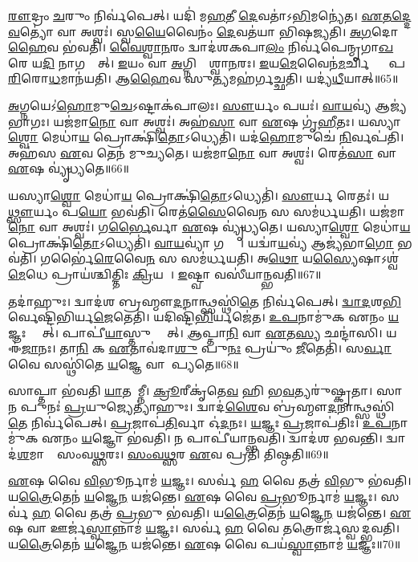 \ul{𑌰𑍗}𑌦𑍍𑌰𑌂 \ul{𑌚}𑌰𑍁𑌂 𑌨𑌿𑌰𑍍𑌵॑𑌪𑍇𑌤𑍍।
𑌯𑌦𑌿॑ 𑌮\ul{𑌹}𑌤𑍀 \ul{𑌦𑍇}𑌵𑌤𑌾॑\-𑌽\ul{𑌭𑌿}𑌮𑌨𑍍𑌯𑍇॑𑌤।
\ul{𑌏}\ul{𑌤}\ul{𑌦𑍍𑌦𑍇}\ul{𑌵}𑌤𑍍𑌯𑍋॑ 𑌵𑌾 𑌅𑌶𑍍𑌵𑌃॑।
𑌸𑍍𑌵\ul{𑌯𑍈}𑌵𑍈𑌨𑌂॑ \ul{𑌦𑍇}𑌵𑌤॑𑌯𑌾 𑌭𑌿𑌷𑌜𑍍𑌯𑌤𑌿।
\ul{𑌅}\ul{𑌗}𑌦𑍋 \ul{𑌹𑍈}𑌵 𑌭॑𑌵𑌤𑌿।
\ul{𑌵𑍈}\ul{𑌶𑍍𑌵𑌾}\ul{𑌨}𑌰𑌂 𑌦𑍍𑌵𑌾𑌦॑𑌶𑌕𑌪𑌾\ul{𑌲𑌂} 𑌨𑌿𑌰𑍍𑌵॑𑌪𑍇𑌨𑍍𑌮𑍃𑌗𑌾\ul{𑌖}𑌰𑍇 𑌯\ul{𑌦𑌿} 𑌨𑌾𑌗𑌚𑍍𑌛𑍇᳚𑌤𑍍।
\ul{𑌇}𑌯𑌂 𑌵𑌾 \ul{𑌅}𑌗𑍍𑌨𑌿𑌰𑍍𑌵𑍈᳚𑌶𑍍𑌵𑌾\ul{𑌨}𑌰𑌃।
\ul{𑌇}𑌯\ul{𑌮𑍇}𑌵𑍈𑌨॑\ul{𑌮}𑌰𑍍𑌚𑌿𑌭𑍍𑌯𑌾𑌂᳚ 𑌪\ul{𑌰𑌿}𑌰𑍋\ul{𑌧}𑌮𑌾𑌨॑𑌯𑌤𑌿।
𑌆\ul{𑌹𑍈}𑌵 𑌸𑍁\ul{𑌤𑍍𑌯}𑌮𑌹॑𑌰𑍍𑌗𑌚𑍍𑌛𑌤𑌿।
𑌯𑌦𑍍𑌯॑\ul{𑌧𑍀}𑌯𑌾𑌤𑍍॥65॥

\ul{𑌅}𑌗𑍍𑌨𑌯𑍇\-𑌽॑\ul{𑌹𑍋}𑌮𑍁\ul{𑌚𑍇}\-𑌽𑌷𑍍𑌟𑌾𑌕॑𑌪𑌾𑌲𑌃।
\ul{𑌸𑍗}𑌰𑍍𑌯𑌂 𑌪𑌯𑌃॑।
\ul{𑌵𑌾}\ul{𑌯}𑌵𑍍𑌯॑ 𑌆𑌜𑍍𑌯॑𑌭𑌾𑌗𑌃।
𑌯𑌜॑𑌮𑌾\ul{𑌨𑍋} 𑌵𑌾 𑌅𑌶𑍍𑌵𑌃॑।
𑌅𑌹॑\ul{𑌸𑌾} 𑌵𑌾 \ul{𑌏}𑌷 𑌗𑍃॑\ul{𑌹𑍀}𑌤𑌃।
𑌯𑌸𑍍𑌯𑌾\ul{𑌶𑍍𑌵𑍋} 𑌮𑍇𑌧𑌾॑\ul{𑌯} 𑌪𑍍𑌰𑍋𑌕𑍍𑌷𑌿॑\ul{𑌤𑍋}\-𑌽𑌧𑍍𑌯𑍇𑌤𑌿॑।
𑌯𑌦॑\ul{𑌹𑍋}𑌮𑍁𑌚𑍇॑ \ul{𑌨𑌿}𑌰𑍍𑌵𑌪॑𑌤𑌿।
𑌅𑌹॑𑌸 \ul{𑌏}𑌵 𑌤𑍇𑌨॑ 𑌮𑍁𑌚𑍍𑌯𑌤𑍇।
𑌯𑌜॑𑌮𑌾\ul{𑌨𑍋} 𑌵𑌾 𑌅𑌶𑍍𑌵𑌃॑।
𑌰𑍇𑌤॑\ul{𑌸𑌾} 𑌵𑌾 \ul{𑌏}𑌷 𑌵𑍍𑌯𑍃॑𑌧𑍍𑌯𑌤𑍇॥66॥

𑌯𑌸𑍍𑌯𑌾\ul{𑌶𑍍𑌵𑍋} 𑌮𑍇𑌧𑌾॑\ul{𑌯} 𑌪𑍍𑌰𑍋𑌕𑍍𑌷𑌿॑\ul{𑌤𑍋}\-𑌽𑌧𑍍𑌯𑍇𑌤𑌿॑।
\ul{𑌸𑍗}𑌰𑍍𑌯 𑌰𑍇𑌤𑌃॑।
𑌯\ul{𑌥𑍍𑌸𑍗}𑌰𑍍𑌯𑌂 𑌪\ul{𑌯𑍋} 𑌭𑌵॑𑌤𑌿।
𑌰𑍇𑌤॑\ul{𑌸𑍈}𑌵𑍈\ul{𑌨}\ul{} 𑌸 𑌸𑌮॑𑌰𑍍𑌧𑌯𑌤𑌿।
𑌯𑌜॑𑌮𑌾\ul{𑌨𑍋} 𑌵𑌾 𑌅𑌶𑍍𑌵𑌃॑।
𑌗\ul{𑌰𑍍𑌭𑍈}𑌰𑍍𑌵𑌾 \ul{𑌏}𑌷 𑌵𑍍𑌯𑍃॑𑌧𑍍𑌯𑌤𑍇।
𑌯𑌸𑍍𑌯𑌾\ul{𑌶𑍍𑌵𑍋} 𑌮𑍇𑌧𑌾॑\ul{𑌯} 𑌪𑍍𑌰𑍋𑌕𑍍𑌷𑌿॑\ul{𑌤𑍋}\-𑌽𑌧𑍍𑌯𑍇𑌤𑌿॑।
\ul{𑌵𑌾}\ul{𑌯}𑌵𑍍𑌯𑌾॑ 𑌗𑌰𑍍𑌭𑌾𑌃᳚।
𑌯𑌦𑍍𑌵𑌾॑\ul{𑌯}𑌵𑍍𑌯॑ 𑌆𑌜𑍍𑌯॑𑌭𑌾\ul{𑌗𑍋} 𑌭𑌵॑𑌤𑌿।
𑌗𑌰𑍍𑌭𑍈॑\ul{𑌰𑍇}𑌵𑍈\ul{𑌨}\ul{} 𑌸 𑌸𑌮॑𑌰𑍍𑌧𑌯𑌤𑌿।
𑌅\ul{𑌥𑍋} 𑌯\ul{𑌸𑍍𑌯𑍈}𑌷𑌾\-𑌽𑌶𑍍𑌵॑\ul{𑌮𑍇}𑌧𑍇 𑌪𑍍𑌰𑌾𑌯॑𑌶𑍍𑌚𑌿𑌤𑍍𑌤𑌿𑌃 \ul{𑌕𑍍𑌰𑌿}𑌯𑌤𑍇᳚।
\ul{𑌇}𑌷𑍍𑌟𑍍𑌵𑌾 𑌵𑌸𑍀॑𑌯𑌾𑌨𑍍𑌭𑌵𑌤𑌿॥67॥\anuvakamend[\ul{𑌵𑌿}𑌨𑍍𑌦𑌤𑍍𑌯𑌶𑍍𑌲𑍋॑𑌣𑍋 \ul{𑌹𑍈}𑌵 𑌭॑𑌵𑌤𑍍𑌯\ul{𑌧𑍀}𑌯𑌾𑌦𑍃॑𑌧𑍍𑌯\ul{𑌤𑍇} 𑌗𑌰𑍍𑌭𑍈॑\ul{𑌰𑍇}𑌵𑍈\ul{𑌨}\ul{\dng{ꣳ}} 𑌸 𑌸𑌮॑𑌰𑍍𑌧𑌯\ul{𑌤𑌿} 𑌦𑍍𑌵𑍇 𑌚॑]

𑌤𑌦𑌾॑𑌹𑍁𑌃।
𑌦𑍍𑌵𑌾𑌦॑𑌶 𑌬𑍍𑌰𑌹𑍍𑌮𑍗\ul{𑌦}𑌨𑌾𑌨𑍍𑌥𑍍𑌸𑌸𑍍𑌥𑌿॑\ul{𑌤𑍇} 𑌨𑌿𑌰𑍍𑌵॑𑌪𑍇𑌤𑍍।
\ul{𑌦𑍍𑌵𑌾}\ul{𑌦}𑌶\ul{𑌭𑌿}𑌰𑍍𑌵𑍇𑌷𑍍𑌟𑌿॑𑌭𑌿𑌰𑍍𑌯\ul{𑌜𑍇}𑌤𑍇𑌤𑌿॑।
𑌯𑌦𑌿𑌷𑍍𑌟𑌿॑\ul{𑌭𑌿}𑌰𑍍𑌯𑌜𑍇॑𑌤।
\ul{𑌉}\ul{𑌪}𑌨𑌾𑌮𑍁॑𑌕 𑌏𑌨𑌂 \ul{𑌯}𑌜𑍍𑌞𑌃 𑌸𑍍𑌯𑌾᳚𑌤𑍍।
𑌪𑌾𑌪𑍀॑\ul{𑌯𑌾}\ul{}𑌸𑍍𑌤𑍁 𑌸𑍍𑌯𑌾᳚𑌤𑍍।
\ul{𑌆}𑌪𑍍𑌤𑌾\ul{𑌨𑌿} 𑌵𑌾 \ul{𑌏}𑌤\ul{𑌸𑍍𑌯} 𑌛𑌨𑍍𑌦𑌾॑𑌸𑌿।
𑌯 𑌈॑\ul{𑌜𑌾}𑌨𑌃।
𑌤𑌾\ul{𑌨𑌿} 𑌕 \ul{𑌏}𑌤𑌾𑌵॑𑌦𑌾\ul{𑌶𑍁} 𑌪𑍁\ul{𑌨𑌃} 𑌪𑍍𑌰𑌯𑍁𑌂॑ \ul{𑌜𑍀}𑌤𑍇𑌤𑌿॑।
𑌸\ul{𑌰𑍍𑌵𑌾} 𑌵𑍈 𑌸𑌸𑍍𑌥𑌿॑𑌤𑍇 \ul{𑌯}𑌜𑍍𑌞𑍇 𑌵𑌾𑌗𑌾᳚𑌪𑍍𑌯𑌤𑍇॥68॥

𑌸𑌾𑌪𑍍𑌤𑌾 𑌭॑𑌵𑌤𑌿 \ul{𑌯𑌾}𑌤𑌯𑌾᳚𑌮𑍍𑌨𑍀।
\ul{𑌕𑍍𑌰𑍂}𑌰𑍀𑌕𑍃॑𑌤𑍇\ul{𑌵} 𑌹𑌿 𑌭\ul{𑌵}𑌤𑍍𑌯𑌰𑍁॑𑌷𑍍𑌕𑍃𑌤𑌾।
𑌸𑌾 𑌨 𑌪𑍁𑌨𑌃॑ \ul{𑌪𑍍𑌰}𑌯𑍁𑌜𑍍𑌯𑍇𑌤𑍍𑌯𑌾॑𑌹𑍁𑌃।
𑌦𑍍𑌵𑌾𑌦॑\ul{𑌶𑍈}𑌵 𑌬𑍍𑌰॑𑌹𑍍𑌮𑍗\ul{𑌦}𑌨𑌾𑌨𑍍𑌥𑍍𑌸𑌸𑍍𑌥𑌿॑\ul{𑌤𑍇} 𑌨𑌿𑌰𑍍𑌵॑𑌪𑍇𑌤𑍍।
\ul{𑌪𑍍𑌰}𑌜𑌾𑌪॑\ul{𑌤𑌿}𑌰𑍍𑌵𑌾 𑌓॑\ul{𑌦}𑌨𑌃।
\ul{𑌯}𑌜𑍍𑌞𑌃 \ul{𑌪𑍍𑌰}𑌜𑌾𑌪॑𑌤𑌿𑌃।
\ul{𑌉}\ul{𑌪}𑌨𑌾𑌮𑍁॑𑌕 𑌏𑌨𑌂 \ul{𑌯}𑌜𑍍𑌞𑍋 𑌭॑𑌵𑌤𑌿।
𑌨 𑌪𑌾𑌪𑍀॑𑌯𑌾𑌨𑍍𑌭𑌵𑌤𑌿।
𑌦𑍍𑌵𑌾𑌦॑𑌶 𑌭𑌵𑌨𑍍𑌤𑌿।
𑌦𑍍𑌵𑌾𑌦॑\ul{𑌶}𑌮𑌾𑌸𑌾𑌃᳚ 𑌸𑌂𑌵\ul{𑌥𑍍𑌸}𑌰𑌃।
\ul{𑌸𑌂}\ul{𑌵}\ul{𑌥𑍍𑌸}𑌰 \ul{𑌏}𑌵 𑌪𑍍𑌰𑌤𑌿॑ 𑌤𑌿𑌷𑍍𑌠𑌤𑌿॥69॥\anuvakamend[\ul{𑌆}\ul{𑌪𑍍𑌯}\ul{𑌤𑍇} \ul{𑌸𑌂}\ul{𑌵}\ul{𑌥𑍍𑌸}𑌰 𑌏𑌕𑌂॑ 𑌚]

\ul{𑌏}𑌷 𑌵𑍈 \ul{𑌵𑌿}𑌭𑍂𑌰𑍍𑌨𑌾𑌮॑ \ul{𑌯}𑌜𑍍𑌞𑌃।
𑌸𑌰𑍍𑌵॑ \ul{𑌹} 𑌵𑍈 𑌤𑌤𑍍𑌰॑ \ul{𑌵𑌿}𑌭𑍁 𑌭॑𑌵𑌤𑌿।
𑌯\ul{𑌤𑍍𑌰𑍈}𑌤𑍇𑌨॑ \ul{𑌯}𑌜𑍍𑌞𑍇\ul{𑌨} 𑌯𑌜॑𑌨𑍍𑌤𑍇।
\ul{𑌏}𑌷 𑌵𑍈 \ul{𑌪𑍍𑌰}𑌭𑍂𑌰𑍍𑌨𑌾𑌮॑ \ul{𑌯}𑌜𑍍𑌞𑌃।
𑌸𑌰𑍍𑌵॑ \ul{𑌹} 𑌵𑍈 𑌤𑌤𑍍𑌰॑ \ul{𑌪𑍍𑌰}𑌭𑍁 𑌭॑𑌵𑌤𑌿।
𑌯\ul{𑌤𑍍𑌰𑍈}𑌤𑍇𑌨॑ \ul{𑌯}𑌜𑍍𑌞𑍇\ul{𑌨} 𑌯𑌜॑𑌨𑍍𑌤𑍇।
\ul{𑌏}𑌷 𑌵𑌾 𑌊𑌰𑍍𑌜॑\ul{𑌸𑍍𑌵𑌾}𑌨𑍍𑌨𑌾𑌮॑ \ul{𑌯}𑌜𑍍𑌞𑌃।
𑌸𑌰𑍍𑌵॑ \ul{𑌹} 𑌵𑍈 𑌤𑌤𑍍𑌰𑍋𑌰𑍍𑌜॑𑌸𑍍𑌵𑌦𑍍𑌭𑌵𑌤𑌿।
𑌯\ul{𑌤𑍍𑌰𑍈}𑌤𑍇𑌨॑ \ul{𑌯}𑌜𑍍𑌞𑍇\ul{𑌨} 𑌯𑌜॑𑌨𑍍𑌤𑍇।
\ul{𑌏}𑌷 𑌵𑍈 𑌪𑌯॑\ul{𑌸𑍍𑌵𑌾}𑌨𑍍𑌨𑌾𑌮॑ \ul{𑌯}𑌜𑍍𑌞𑌃॥70॥

